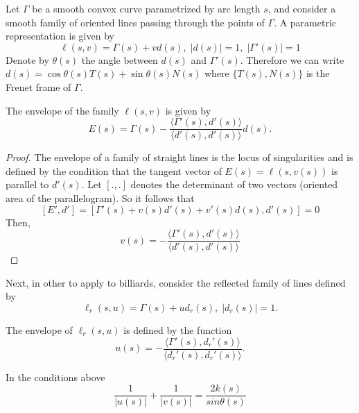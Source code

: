Let $\Gamma$ be a smooth convex curve parametrized by arc length $s$, and consider  a smooth family of oriented lines passing through the points of $\Gamma$. A parametric representation is given by
\[ \ell(s,v)= \Gamma(s)+ v d(s), \; |d(s)|=1,  \; |\Gamma'(s)|=1\]
Denote by $\theta(s)$ the angle between $d(s)$ and $\Gamma'(s)$. Therefore we can write
$d(s)=\cos\theta(s) T(s)+\sin\theta(s) N(s)$
where $\{T(s),N(s)\}$ is the Frenet frame of $\Gamma.$

 \begin{lemma}\label{lem:appC-envelope}
 The envelope of the family $\ell(s,v)$ is given by
 \[ E(s)=\Gamma(s)-\frac{\langle \Gamma'(s),d'(s)\rangle}{\langle d'(s),d'(s)\rangle} d(s).\]
\end{lemma}

\begin{proof} The envelope of a family of straight lines
is the locus of singularities and is defined by  the condition that the tangent vector of $E(s)=\ell(s,v(s))$ is parallel to $d'(s)$. Let  $[.,.]$ denotes the determinant of two vectors (oriented area of the parallelogram).
So it follows that
\[[E',d']=[\Gamma'(s)+v(s)d'(s)+v'(s)d(s),d'(s)]=0\]
    Then,
    \[ v(s)=-\frac{\langle \Gamma'(s),d'(s)\rangle}{\langle d'(s),d'(s)\rangle}\]
\end{proof}

Next, in other to apply to   billiards, consider the reflected family of lines defined by
\[\ell_r(s,u)= \Gamma(s)+u d_r(s), \; |d_r(s)|=1.\]

The envelope of $\ell_r(s,u)$ is defined by the function
\[ u(s)=-\frac{\langle \Gamma'(s),d_r'(s)\rangle}{\langle d_r'(s),d_r'(s)\rangle}.\]

\begin{proposition}\label{prop:appC-otica}
In the conditions above 
\begin{equation}
    \frac{1}{|u(s)|}+ \frac{1}{|v(s)|}=\frac{2k(s)}{sin\theta(s)}
\end{equation}
\end{proposition}

